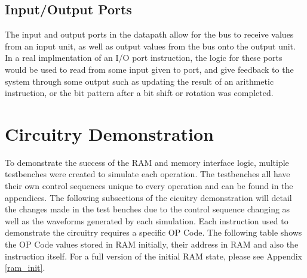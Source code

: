 \documentclass{article}
\begin{document}
    \subsection{Input/Output Ports}
    The input and output ports in the datapath allow for the bus to receive values from an input unit, as well as output values from the bus onto the output unit. In a real implmentation of an I/O port instruction, the logic for these ports would be used to read from some input given to port, and give feedback to the system through some output such as updating the result of an arithmetic instruction, or the bit pattern after a bit shift or rotation was completed.

\section{Circuitry Demonstration}
    To demonstrate the success of the RAM and memory interface logic, multiple testbenches were created to simulate each operation. 
    The testbenches all have their own control sequences unique to every operation and can be found in the appendices. The following subsections 
    of the cicuitry demonstration will detail the changes made in the test benches due to the control sequence changing as well as the waveforms generated by each simulation.
    Each instruction used to demonstrate the circuitry requires a specific OP Code. The following table shows the OP Code values stored in RAM initially, their address in RAM and also the instruction itself. For a full version of the initial RAM state, please see Appendix \ref{ram_init}.
\end{document}
